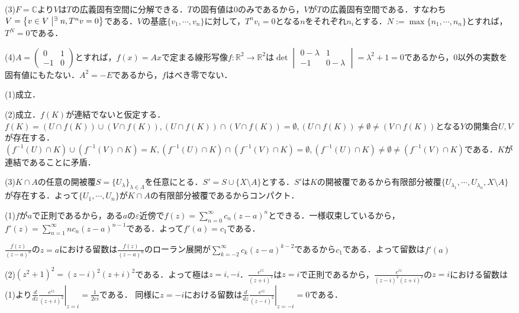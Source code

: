 \documentclass[
		book,
		head_space=20mm,
		foot_space=20mm,
		gutter=10mm,
		line_length=190mm
]{jlreq}
\begin{document}
(3)$F=\mathbb{C}$より$V$は$T$の広義固有空間に分解できる．$T$の固有値は$0$のみであるから，$V$が$T$の広義固有空間である．すなわち$V=\left\{ v \in V \mathrel{}\middle|\mathrel{} ^\exists n, T^nv=0\right\}$である．$V$の基底$\{v_1,\cdots,v_n\}$に対して，$T^nv_i=0$となる$n$をそれぞれ$n_i$とする．$N:=\max\{n_1,\cdots,n_n\}$とすれば，$T^N=0$である．

(4)$A=\begin{pmatrix}
 0 & 1\\
 -1 & 0
\end{pmatrix}$とすれば，$f(x)=Ax$で定まる線形写像$f \colon \mathbb{R}^2 \rightarrow \mathbb{R}^2$は$\det \begin{vmatrix}
	 0-\lambda & 1\\
 -1 & 0-\lambda
 \end{vmatrix}=\lambda^2+1=0$であるから，$0$以外の実数を固有値にもたない．$A^2=-E$であるから，$f$はべき零でない．

 (1)成立．

 (2)成立．$f(K)$が連結でないと仮定する．$f(K)=(U\cap f(K))\cup (V\cap f(K)), (U\cap f(K))\cap (V\cap f(K))=\emptyset,(U\cap f(K))\neq \emptyset \neq (V\cap f(K))$となる$Y$の開集合$U,V$が存在する．
 $(f^{-1}(U)\cap K) \cup (f^{-1}(V)\cap K)=K,(f^{-1}(U)\cap K)\cap (f^{-1}(V)\cap K)=\emptyset,(f^{-1}(U)\cap K)\neq \emptyset \neq (f^{-1}(V)\cap K)$である．$K$が連結であることに矛盾．

 (3)$K\cap A$の任意の開被覆$S=\{ U_\lambda\}_{\lambda\in \Lambda}$を任意にとる．$S'=S\cup \{X\setminus A\}$とする．$S'$は$K$の開被覆であるから有限部分被覆$\{U_{\lambda_1},\cdots,U_{\lambda_n},X\setminus A\}$が存在する．よって$\{ U_1,\cdots,U_n\}$が$K\cap A$の有限部分被覆であるからコンパクト．

 (1)$f$が$a$で正則であるから，ある$a$の$\varepsilon$近傍で$f(z)=\sum\limits_{n=0}^\infty c_n(z-a)^n$とできる．一様収束しているから，$f'(z)=\sum\limits_{n=1}^\infty nc_n(z-a)^{n-1}$である．よって$f'(a)=c_1$である．

 $\frac{f(z)}{(z-a)^n}$の$z=a$における留数は$\frac{f(z)}{(z-a)^n}$のローラン展開が$\sum\limits_{k=-2}^\infty c_k(z-a)^{k-2}$であるから$c_{1}$である．よって留数は$f'(a)$

 (2)$(z^2+1)^2=(z-i)^2(z+i)^2$である．よって極は$z=i,-i$．$\frac{e^{iz}}{(z+i)^2}$は$z=i$で正則であるから，$\frac{e^{iz}}{(z-i)^2(z+i)^2}$の$z=i$における留数は(1)より$\frac{d}{dz}\left. \frac{e^{iz}}{(z+i)^2}\right|_{z=i}=\frac{1}{2ei}$である．
 同様に$z=-i$における留数は$\frac{d}{dz}\left. \frac{e^{iz}}{(z-i)^2}\right|_{z=-i}=0$である．
\end{document}
